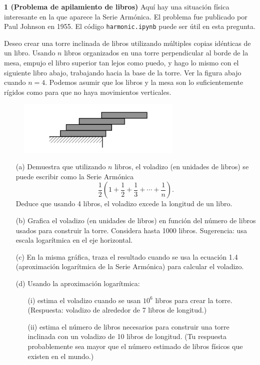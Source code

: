 \documentclass{article}
\begin{document}
\textbf{1 (Problema de apilamiento de libros)} Aquí hay una situación física interesante en la que aparece la Serie Armónica. El problema fue publicado por Paul Johnson en 1955. El código \texttt{harmonic.ipynb} puede ser útil en esta pregunta.

Deseo crear una torre inclinada de libros utilizando múltiples copias idénticas de un libro. Usando \(n\) libros organizados en una torre perpendicular al borde de la mesa, empujo el libro superior tan lejos como puedo, y hago lo mismo con el siguiente libro abajo, trabajando hacia la base de la torre. Ver la figura abajo cuando \(n = 4\). Podemos asumir que los libros y la mesa son lo suficientemente rígidos como para que no haya movimientos verticales.

\begin{figure}[h]
    \centering
    \includegraphics[width=0.7\textwidth]{pictures/block.png}
    \label{fig:1img}
\end{figure}

\begin{itemize}
    \item[(a)] Demuestra que utilizando \(n\) libros, el voladizo (en unidades de libros) se puede escribir como la Serie Armónica
    \[
    \frac{1}{2} \left(1 + \frac{1}{2} + \frac{1}{3} + \cdots + \frac{1}{n}\right).
    \]
    Deduce que usando 4 libros, el voladizo excede la longitud de un libro.
    
    \item[(b)] Grafica el voladizo (en unidades de libros) en función del número de libros usados para construir la torre. Considera hasta 1000 libros. Sugerencia: usa escala logarítmica en el eje horizontal.
    
    \item[(c)] En la misma gráfica, traza el resultado cuando se usa la ecuación 1.4 (aproximación logarítmica de la Serie Armónica) para calcular el voladizo.
    
    \item[(d)] Usando la aproximación logarítmica:
    \begin{itemize}
        \item[(i)] estima el voladizo cuando se usan \(10^6\) libros para crear la torre. (Respuesta: voladizo de alrededor de 7 libros de longitud.)
        
        \item[(ii)] estima el número de libros necesarios para construir una torre inclinada con un voladizo de 10 libros de longitud. (Tu respuesta probablemente sea mayor que el número estimado de libros físicos que existen en el mundo.)
    \end{itemize}
\end{itemize}
\end{document}
